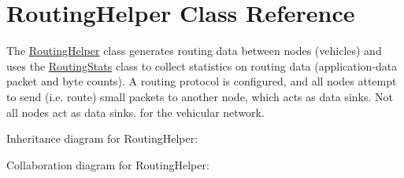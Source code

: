 \hypertarget{classRoutingHelper}{}\section{Routing\+Helper Class Reference}
\label{classRoutingHelper}


The \hyperlink{classRoutingHelper}{Routing\+Helper} class generates routing data between nodes (vehicles) and uses the \hyperlink{classRoutingStats}{Routing\+Stats} class to collect statistics on routing data (application-\/data packet and byte counts). A routing protocol is configured, and all nodes attempt to send (i.\+e. route) small packets to another node, which acts as data sinks. Not all nodes act as data sinks. for the vehicular network.  




Inheritance diagram for Routing\+Helper\+:


Collaboration diagram for Routing\+Helper\+:
